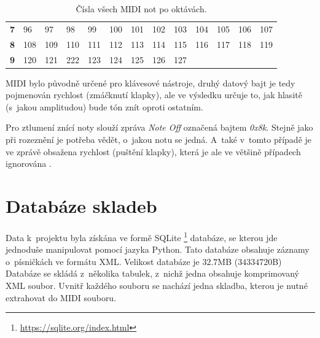 \begin{table}[]
\begin{tabular}{l|llllllllllll}
        \textbf{7}                       & 96         & 97           & 98         & 99           & 100        & 101        & 102          & 103        & 104          & 105        & 106          & 107        \\
        \textbf{8}                       & 108        & 109          & 110        & 111          & 112        & 113        & 114          & 115        & 116          & 117        & 118          & 119        \\
        \textbf{9}                       & 120        & 121          & 222        & 123          & 124        & 125        & 126          & 127        & \multicolumn{4}{l}{}                                 
    \end{tabular}
    \caption{Čísla všech MIDI not po oktávách. \cite{Back_SMF_Specif}}
    \label{tableMIDINotes}
\end{table}

MIDI bylo původně určené pro klávesové nástroje, 
druhý datový bajt je tedy pojmenován rychlost (zmáčknutí klapky),
ale ve výsledku určuje to, jak hlasitě (s~jakou amplitudou) bude tón znít oproti ostatním.

Pro ztlumení znící noty slouží zpráva \emph{Note Off} označená bajtem \emph{0x8k}.
Stejně jako při rozeznění je potřeba vědět, o~jakou notu se jedná.
A~také v~tomto případě je ve zprávě obsažena rychlost (puštění klapky), 
která je ale ve většině případech ignorována
\cite{MIDI_tutorials}.

\section{Databáze skladeb}
\label{hooktheoryDB}
Data k~projektu byla získána ve formě SQLite
\footnote{\url{https://sqlite.org/index.html}} databáze,
se kterou jde jednoduše manipulovat pomocí jazyka Python.
Tato databáze obsahuje záznamy o~písničkách ve formátu XML.
Velikost databáze je $32.7$MB ($34 334 720$B)
Databáze se skládá z~několika tabulek,
z~nichž jedna obsahuje komprimovaný XML soubor.
Uvnitř každého souboru se nachází jedna skladba,
kterou je nutné extrahovat do MIDI souboru.
\par

